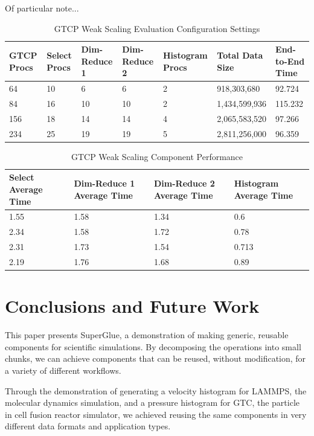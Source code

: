 \documentclass[conference]{IEEEtran}
\begin{document}
Of particular note...

\begin{table}[tbp]
\centering
\caption{GTCP Weak Scaling Evaluation Configuration Settings}
\label{tab:eval-weak-gtcp-1}
\begin{tabular}{|l|l|l|l|l|l|l|}
\hline
GTCP Procs & Select Procs & Dim-Reduce 1 & Dim-Reduce 2 & Histogram Procs & Total Data Size & End-to-End Time\\
\hline
64 & 10 & 6 & 6 & 2 & 918,303,680 & 92.724\\
\hline
84 & 16 & 10 & 10 & 2 & 1,434,599,936 & 115.232\\
\hline
156 & 18 & 14 & 14 & 4 & 2,065,583,520 & 97.266\\
\hline
234 & 25 & 19 & 19 & 5 & 2,811,256,000 & 96.359\\
\hline
\end{tabular}
\end{table}

\begin{table}[tbp]
\centering
\caption{GTCP Weak Scaling Component Performance}
\label{tab:eval-weak-gtcp-2}
\begin{tabular}{|p{0.67 in}|p{0.67 in}|p{0.67 in}|p{0.65 in}|}
\hline
Select Average Time & Dim-Reduce 1 Average Time & Dim-Reduce 2 Average Time & Histogram Average Time\\
\hline
1.55 & 1.58 & 1.34 & 0.6\\
\hline
2.34 & 1.58 & 1.72 & 0.78\\
\hline
2.31 & 1.73 & 1.54 & 0.713\\
\hline
2.19 & 1.76 & 1.68 & 0.89\\
\hline
\end{tabular}
\end{table}

\section{Conclusions and Future Work}
\label{s:conclusion}

This paper presents SuperGlue, a demonstration of making generic, reusable
components for scientific simulations. By decomposing the operations into small
chunks, we can achieve components that can be reused, without modification, for
a variety of different workflows.

Through the demonstration of generating a velocity histogram for LAMMPS, the
molecular dynamics simulation, and a pressure histogram for GTC, the particle
in cell fusion reactor simulator, we achieved reusing the same components in
very different data formats and application types.
\end{document}
